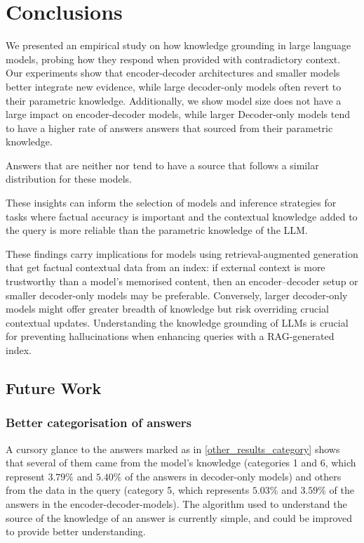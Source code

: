 \section{Conclusions}

We presented an empirical study on how knowledge grounding in large language models, probing how they respond when provided with contradictory context.
Our experiments show that encoder-decoder architectures and smaller models better integrate new evidence, while large decoder-only models often revert to their parametric knowledge.
Additionally, we show model size does not have a large impact on encoder-decoder models, while larger Decoder-only models tend to have a higher rate of answers answers that sourced from their parametric knowledge.

Answers that are neither \Parametric{} nor \Contextual{} tend to have a source that follows a similar distribution for these models.

These insights can inform the selection of models and inference strategies for tasks where factual accuracy is important and the contextual knowledge added to the query is more reliable than the parametric knowledge of the LLM.

These findings carry implications for models using retrieval-augmented generation that get factual contextual data from an index: if external context is more trustworthy than a model's memorised content, then an encoder–decoder setup or smaller decoder-only models may be preferable.
Conversely, larger decoder-only models might offer greater breadth of knowledge but risk overriding crucial contextual updates.
Understanding the knowledge grounding of LLMs is crucial for preventing hallucinations when enhancing queries with a RAG-generated index.

\subsection{Future Work}

\subsubsection{Better categorisation of \Other{} answers}
A cursory glance to the answers marked as \Other{} in \cref{other_results_category} shows that several of them came from the model's \Parametric{} knowledge (categories 1 and 6, which represent $3.79\%$ and $5.40\%$ of the answers in decoder-only models) and others from the \Contextual{} data in the query (category 5, which represents $5.03\%$ and $3.59\%$ of the answers in the encoder-decoder-models).
The algorithm used to understand the source of the knowledge of an answer is currently simple, and could be improved to provide better understanding.


